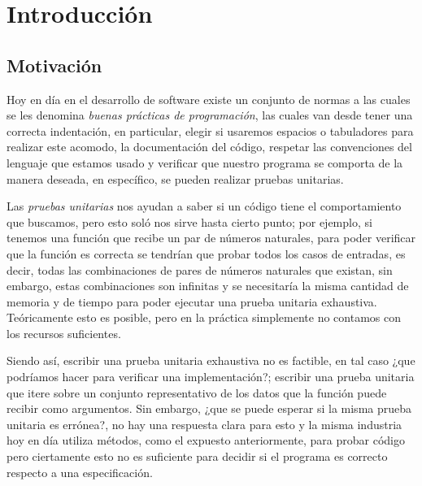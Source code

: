 \chapter{Introducción}

\section{Motivación}
\label{motivation}
Hoy en día en el desarrollo de software existe un conjunto de normas a las cuales se les denomina
\textit{buenas pr\'acticas de programaci\'on}, las cuales van desde tener una correcta
indentaci\'on, en particular, elegir si usaremos espacios o tabuladores para realizar este acomodo, la
documentaci\'on del c\'odigo, respetar las convenciones del lenguaje que estamos usado y verificar
que nuestro programa se comporta de la manera deseada, en espec\'ifico, se pueden realizar pruebas unitarias.

Las \textit{pruebas unitarias} nos ayudan a saber si un código tiene el comportamiento
que buscamos, pero esto sol\'o nos sirve hasta cierto punto; por ejemplo, si tenemos una funci\'on
que recibe un par de números naturales, para poder verificar que la funci\'on es
correcta se tendrían que probar todos los casos de entradas, es decir, todas las combinaciones de pares de números
naturales que existan, sin embargo, estas combinaciones son infinitas y se necesitaría la misma
cantidad de memoria y de tiempo para poder ejecutar una prueba unitaria exhaustiva.
Teóricamente esto es posible, pero en la pr\'actica simplemente no contamos con los recursos suficientes.

Siendo as\'i, escribir una prueba unitaria exhaustiva no es factible, en tal caso ¿que podríamos
hacer para verificar una implementaci\'on?; escribir una prueba unitaria que itere sobre un conjunto representativo de los datos que la
funci\'on puede recibir como argumentos. Sin embargo, ¿que se puede esperar si la misma prueba unitaria es errónea?,
no hay una respuesta clara para esto y la misma industria hoy en día utiliza métodos, como el
expuesto anteriormente, para probar c\'odigo pero ciertamente esto no es suficiente para decidir si el programa es
correcto respecto a una especificaci\'on.

